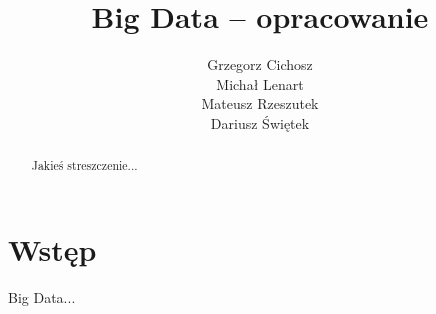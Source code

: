 \documentclass[11pt]{article}
\title{\textbf{Big Data -- opracowanie}}
\author{Grzegorz Cichosz\\
    Michał Lenart\\
    Mateusz Rzeszutek\\
    Dariusz Świętek}
\date{}
\begin{document}
\maketitle

\begin{abstract}
    Jakieś streszczenie...
\end{abstract}

\tableofcontents
\clearpage

\section{Wstęp}
\label{sec:wstep}

Big Data...



\nocite{*}


\end{document}
